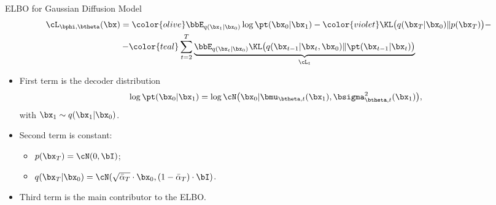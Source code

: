 \documentclass{beamer}
\begin{document}
\begin{frame}{ELBO for Gaussian Diffusion Model}
        \vspace{-0.5cm}
        \begin{multline*}
            \cL_{\bphi, \btheta}(\bx) =  {\color{olive}\bbE_{q(\bx_1 | \bx_0)} \log \pt(\bx_0 | \bx_1)} - {\color{violet}\KL\bigl(q(\bx_T | \bx_0) \| p(\bx_T)\bigr)} - \\
            - {\color{teal}\sum_{t=2}^T \underbrace{ \bbE_{q(\bx_t | \bx_0)} \KL \bigl(q(\bx_{t-1} | \bx_t, \bx_0) \| \pt(\bx_{t-1} | \bx_t)\bigr)}_{\cL_t}}
        \end{multline*}
        \vspace{-0.5cm}
    \eqpause
    \begin{itemize}
        \item {\color{olive}First term} is the decoder distribution
        \[
            \log \pt(\bx_0 | \bx_1) = \log \cN \bigl(\bx_0 | \bmu_{\btheta, t}(\bx_1), \bsigma_{\btheta, t}^2(\bx_1)\bigr),
        \] 
        with $\bx_1 \sim q(\bx_1 | \bx_0)$.
        \eqpause
        \item {\color{violet}Second term} is constant: 
        \begin{itemize}
            \item $p(\bx_T) = \cN(0, \bI)$;
            \item $q(\bx_T | \bx_0) = \cN(\sqrt{\bar{\alpha}_T} \cdot \bx_0, (1 - \bar{\alpha}_T) \cdot \bI)$.
        \end{itemize}
        \eqpause
        \item {\color{teal}Third term} is the main contributor to the ELBO.
    \end{itemize}
\end{frame}
\end{document}
